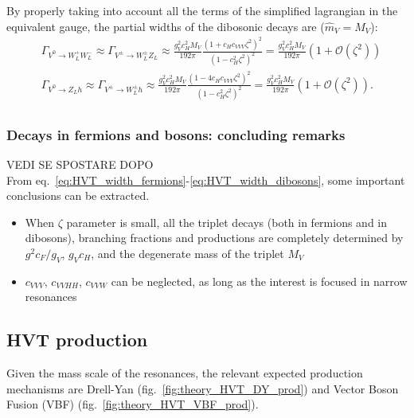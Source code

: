 By properly taking into account all the terms of the simplified lagrangian in the equivalent gauge, the partial widths of the dibosonic decays are ($\hat{m}_V = M_V$):
\begin{equation}
\begin{split}
 & \Gamma_{V^0 \rightarrow W^+_L W^-_L} \approx \Gamma_{V^{\pm} \rightarrow W^{\pm}_L Z_L} \approx \frac{g_V^2 c_H^2 M_V}{192 \pi} \frac{ \left( 1 + c_H c_{VVV} \zeta^2 \right)^2 }{ \left( 1 - c_H^2 \zeta^2\right)^2 } = \frac{g_V^2 c_H^2 M_V}{192 \pi} \left( 1 + \mathcal{O}(\zeta^2) \right)\\
 & \Gamma_{V^0 \rightarrow Z_L h} \approx \Gamma_{V^{\pm} \rightarrow W^{\pm}_L h} \approx \frac{g_V^2 c_H^2 M_V}{192 \pi} \frac{ \left( 1 - 4 c_H c_{VVV} \zeta^2 \right)^2 }{ \left( 1 - c_H^2 \zeta^2\right)^2 } = \frac{g_V^2 c_H^2 M_V}{192 \pi} \left( 1 + \mathcal{O}(\zeta^2) \right).\\
\end{split}
\label{eq:HVT_width_dibosons}
\end{equation}

\subsubsection{Decays in fermions and bosons: concluding remarks}
\label{sec:theory_remarks}
{\color{red} VEDI SE SPOSTARE DOPO}\\
From eq.~\ref{eq:HVT_width_fermions}-\ref{eq:HVT_width_dibosons}, some important conclusions can be extracted.
\begin{itemize}
\item When $\zeta$ parameter is small, all the triplet decays (both in fermions and in dibosons), branching fractions and productions are completely determined by $g^2 c_F /g_V$, $g_V c_H$, and the degenerate mass of the triplet $M_V$
\item $c_{VVV}$, $c_{VVHH}$, $c_{VVW}$ can be neglected, as long as the interest is focused in narrow resonances
\end{itemize}

\subsection{HVT production}
\label{sec:theory_widths}
Given the mass scale of the resonances, the relevant expected production mechanisms are Drell-Yan (fig.~\ref{fig:theory_HVT_DY_prod}) and Vector Boson Fusion (VBF) (fig.~\ref{fig:theory_HVT_VBF_prod}).

